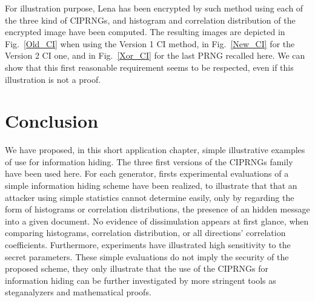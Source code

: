 For illustration purpose, Lena has been encrypted by such method using each of the three kind of
CIPRNGs, and histogram and correlation distribution of the encrypted image have been computed. The resulting images are depicted in Fig.~\ref{Old_CI}
when using the Version 1 CI method, in Fig.~\ref{New_CI} for the Version 2 CI one, and in Fig.~\ref{Xor_CI} for the last PRNG recalled here.
We can show that this first reasonable requirement seems to be respected, even if this illustration
is not a proof.

\section{Conclusion}

We have %
proposed, in this short application chapter, simple illustrative examples of use for information hiding.
The three first versions of the CIPRNGs family have been used here. 
For each generator,
firsts experimental evaluations of a simple information hiding scheme have been realized,
to illustrate that that an attacker using simple
statistics cannot determine easily, only by regarding the form of histograms or
 correlation distributions, the presence of an hidden message into a given document.
No evidence of dissimulation appears at first glance, when comparing histograms, correlation distribution, or all directions' correlation coefficients. Furthermore, experiments have illustrated high sensitivity to the secret parameters.
These simple evaluations do not imply the security of the proposed scheme, they only illustrate that the
use of the CIPRNGs for information hiding can be further investigated by more stringent tools
as steganalyzers and
mathematical proofs.
